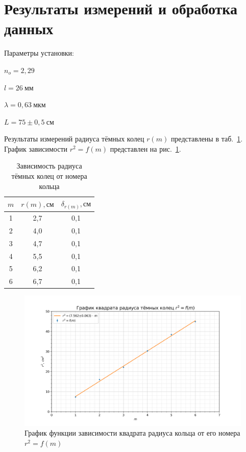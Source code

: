 \documentclass[a4paper, 12pt]{article}
\begin{document}
\section{Результаты измерений и обработка данных}

Параметры установки:
\begin{description}
\item{} $n_o = 2,29$
\item{} $l = 26~мм$
\item{} $\lambda = 0,63~мкм$
\item{} $L = 75\pm0,5~см$
\end{description}

Результаты измерений радиуса тёмных колец $r(m)$ представлены в таб.~\ref{tab1}. График зависимости $r^2 = f(m)$ представлен на рис.~\ref{plot1}.

\begin{table}[h!]
\begin{center}
\begin{tabular}{|c|c|c|}
\hline
$m$ & $r(m), см$ & $\delta_{r(m)}, см$ \\ \hline
1 & 2,7      & 0,1       \\ \hline
2 & 4,0      & 0,1       \\ \hline
3 & 4,7      & 0,1       \\ \hline
4 & 5,5      & 0,1       \\ \hline
5 & 6,2      & 0,1       \\ \hline
6 & 6,7      & 0,1       \\ \hline
\end{tabular}
\end{center}
\caption{Зависимость радиуса тёмных колец от номера кольца}
\label{tab1}
\end{table}

\begin{figure}[h!]
\begin{center}
    \includegraphics[scale=0.7]{4.7.2_1.png}
\end{center}
\caption{График функции зависимости квадрата радиуса кольца от его номера $r^2 = f(m)$}
\label{plot1}
\end{figure}
\end{document}

